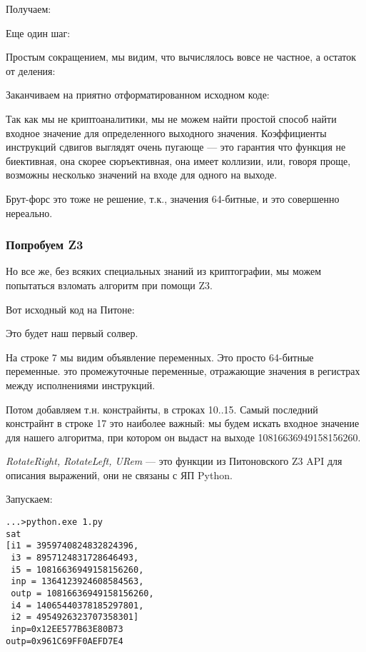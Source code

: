 Получаем:



Еще один шаг:



Простым сокращением, мы видим, что вычислялось вовсе не частное, а остаток от деления:



Заканчиваем на приятно отформатированном исходном коде:



Так как мы не криптоаналитики, мы не можем найти простой способ найти входное значение
для определенного выходного значения.
Коэффициенты инструкций сдвигов выглядят очень пугающе --- это гарантия что функция не биективная,
она скорее сюръективная,
она имеет коллизии, или, говоря проще, возможны несколько значений на входе для одного на выходе.

Брут-форс это тоже не решение, т.к., значения 64-битные, и это совершенно нереально.

\subsubsection{Попробуем Z3}

Но все же, без всяких специальных знаний из криптографии, мы можем попытаться взломать алгоритм при помощи Z3.

Вот исходный код на Питоне:



Это будет наш первый солвер.

На строке 7 мы видим объявление переменных.
Это просто 64-битные переменные.
 это промежуточные переменные, отражающие значения в регистрах между исполнениями инструкций.

Потом добавляем т.н. констрайнты, в строках 10..15.
Самый последний констрайнт в строке 17 это наиболее важный: мы будем искать входное значение для
нашего алгоритма, при котором он выдаст на выходе 10816636949158156260.

\textit{RotateRight, RotateLeft, URem} --- это функции из Питоновского Z3 \ac{API} для описания выражений, 
они не связаны с ЯП Python.

Запускаем:

\begin{lstlisting}
...>python.exe 1.py
sat
[i1 = 3959740824832824396,
 i3 = 8957124831728646493,
 i5 = 10816636949158156260,
 inp = 1364123924608584563,
 outp = 10816636949158156260,
 i4 = 14065440378185297801,
 i2 = 4954926323707358301]
 inp=0x12EE577B63E80B73
outp=0x961C69FF0AEFD7E4
\end{lstlisting}

